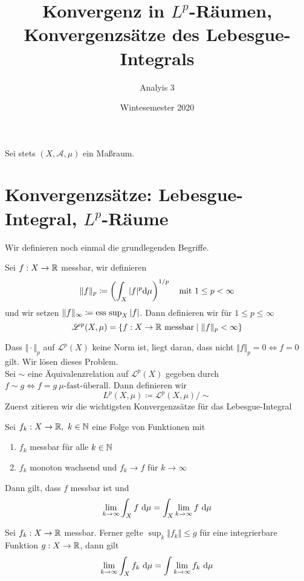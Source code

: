 \documentclass{scrartcl}
\title{Konvergenz in $L^p$-Räumen, Konvergenzsätze des Lebesgue-Integrals}
\date{Wintesemester 2020}
\subtitle{Analyis 3}
\author{}
\begin{document}
\maketitle
Sei stets $(X,\mathscr{A},\mu)$ ein Maßraum.
\section{Konvergenzsätze: Lebesgue-Integral, $L^p$-Räume}
Wir definieren noch einmal die grundlegenden Begriffe.
    \begin{defn} Sei $f:X\to \mathbb{R}$ messbar, wir definieren 
        \[
        \Vert f\Vert_p \coloneqq \left(\int_X \vert f\vert^p \D \mu\right)^{1/p} \quad \mathrm{mit } \ 1\le p<\infty    
        \]
        und wir setzen $\Vert f\Vert_\infty \coloneqq \operatorname{\operatorname{ess \ sup}}_X \vert f\vert$. Dann definieren wir für $1\le p\le \infty$
        \[
        \mathscr{L}^p(X,\mu) = \{f:X\to \R \ \mathrm{messbar} \mid \Vert f\Vert_p<\infty\}    
        \]
    \end{defn}
    Dass $\Vert \cdot\Vert_p$ auf $\mathscr{L}^p(X)$ keine Norm ist, liegt daran, dass 
    nicht $\Vert f\Vert_p = 0 \iff f=0$ gilt. Wir lösen dieses Problem.\\
    Sei $\sim$ eine Äquivalenzrelation auf $\mathscr{L}^p(X)$ gegeben durch $f\sim g\iff f=g \ \mu\text{-fast-überall}$. Dann definieren wir
    \[
    L^p(X,\mu) \coloneqq \mathscr{L}^p(X,\mu)/\sim    
    \] 
     Zuerst zitieren wir die wichtigsten 
    Konvergenzsätze für das Lebesgue-Integral
    \begin{satz} Sei $f_k:X\to \mathbb{R}, \ k\in \mathbb{N}$ eine Folge von Funktionen mit 
    \begin{enumerate}
        \item $f_k$ messbar für alle $k\in \mathbb{N}$
        \item $f_k$ monoton wachsend und $f_k \to f$ für $k\to \infty$
    \end{enumerate} Dann gilt, dass $f$ messbar ist und
        \[
        \lim_{k\to \infty} \int_X f\ \mathrm{d} \mu = \int_X \lim_{k\to \infty} f\ \mathrm{d} \mu    
        \]
    \end{satz}
    \begin{satz} Sei $f_k:X\to \mathbb{R}$ messbar. Ferner gelte ${\sup_k \Vert f_k\Vert \le g}$ für eine integrierbare Funktion $g:X\to \mathbb{R}$, dann gilt
        \[
        \lim_{k\to \infty} \int_X f_k \ \mathrm{d} \mu = \int \lim_{k\to\infty } f_k \ \mathrm{d} \mu    
        \]
    \end{satz}
\end{document}
